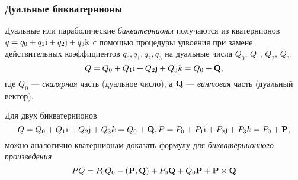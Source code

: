 \begin{frame}
  \frametitle{Дуальные бикватернионы}
  Дуальные или параболические \emph{бикватернионы} получаются из кватернионов $q = q_0 + q_1\mathrm{i} + q_2 \mathrm{j} + q_3 \mathrm{k}$ с помощью процедуры удвоения при замене действительных коэффициентов $q_0,q_1,q_2,q_3$ на дуальные числа $Q_0$, $Q_1$, $Q_2$, $Q_3$.
  \begin{equation*}
    Q = Q_0 + Q_1\mathrm{i} + Q_2\mathrm{j} + Q_3 k = Q_0 + \vb{Q},
  \end{equation*}
  где $Q_0$ --- \emph{скалярная} часть (дуальное число), а $\vb{Q}$ --- \emph{винтовая} часть (дуальный вектор).

  Для двух бикватернионов
  \begin{equation*}
    Q = Q_0 + Q_1\mathrm{i} + Q_2\mathrm{j} + Q_3 k = Q_0 + \vb{Q},
    P = P_0 + P_1\mathrm{i} + P_2\mathrm{j} + P_3 k = P_0 + \vb{P},
  \end{equation*}
  можно аналогично кватернионам доказать формулу для \emph{бикватернионного произведения}
  \begin{equation*}
    PQ = P_0Q_0 - (\vb{P}, \vb{Q}) + P_0 \vb{Q} + Q_0\vb{P} + \vb{P}\times\vb{Q}
  \end{equation*}
\end{frame}
